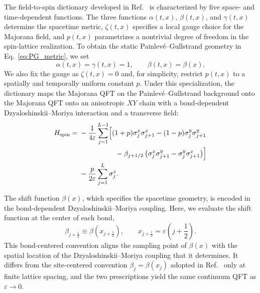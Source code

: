 \documentclass[reprint,amsmath,amssymb,aps,prb,showkeys,superscriptaddress]{revtex4-2}
\begin{document}
The field-to-spin dictionary developed in
Ref.~\cite{Kinoshita2025} is characterized by five space- and
time-dependent functions. The three functions
$\alpha(t,x)$, $\beta(t,x)$, and $\gamma(t,x)$ determine the
spacetime metric, $\zeta(t,x)$ specifies a local gauge choice for the
Majorana field, and $p(t,x)$ parametrizes a nontrivial degree of freedom in the
spin-lattice realization. To obtain the static
Painlev\'e--Gullstrand geometry in Eq.~\eqref{eq:PG_metric}, we set
\begin{equation}
  \alpha(t,x)=\gamma(t,x)=1,
  \qquad
  \beta(t,x)=\beta(x).
  \label{eq:dictionary_specialization}
\end{equation}
We also fix the gauge as $\zeta(t,x)=0$ and, for simplicity, restrict
$p(t,x)$ to a spatially and temporally uniform constant $p$. 
Under this specialization, the dictionary maps the Majorana QFT on
the Painlev\'e--Gullstrand background onto the
Majorana QFT onto an anisotropic $XY$ chain with a bond-dependent Dzyaloshinskii--Moriya interaction and a transverse field:
\begin{align}
  H_{\mathrm{spin}}
  ={}&
  -\frac{1}{4\varepsilon}
  \sum_{j=1}^{L-1}
  \Bigl[
    (1+p)\sigma_j^x\sigma_{j+1}^x
    -(1-p)\sigma_j^y\sigma_{j+1}^y
  \nonumber\\
  &\hspace{18mm}
    -\beta_{j+1/2}
    \left(
      \sigma_j^x\sigma_{j+1}^y
      -
      \sigma_j^y\sigma_{j+1}^x
    \right)
  \Bigr]
  \nonumber\\
  &-\frac{p}{2\varepsilon}
  \sum_{j=1}^{L}\sigma_j^z.
  \label{eq:spin_Hamiltonian}
\end{align}


The shift function $\beta(x)$, which specifies the spacetime geometry, is encoded in the bond-dependent
Dzyaloshinskii--Moriya coupling. Here, we evaluate the shift function at the center of each bond,
\begin{equation}
  \beta_{j+\frac12}
  \equiv
  \beta\left(x_{j+\frac12}\right),
  \qquad
  x_{j+\frac12}
  =
  \varepsilon\left(j+\frac12\right).
  \label{eq:lattice_beta}
\end{equation}
This bond-centered convention aligns the sampling point of
$\beta(x)$ with the spatial location of the
Dzyaloshinskii--Moriya coupling that it determines. It differs from
the site-centered convention
$\beta_j=\beta(x_j)$ adopted in Ref.~\cite{Kinoshita2025} only at
finite lattice spacing, and the two prescriptions yield the same
continuum QFT as $\varepsilon\to0$.
\end{document}
